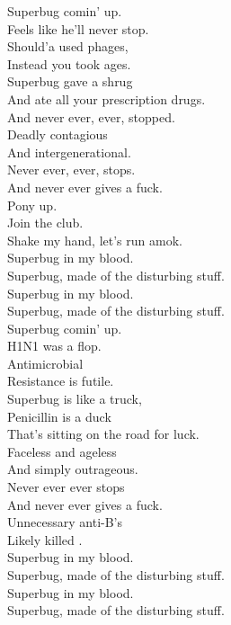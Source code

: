 


Superbug comin' up. \\
Feels like he'll never stop. \\
Should'a used phages, \\
Instead you took ages. \\
Superbug gave a shrug \\
And ate all your prescription drugs. \\
And never ever, ever, stopped. \\
Deadly contagious \\
And intergenerational. \\
Never ever, ever, stops. \\
And never ever gives a fuck. \\

Pony up. \\
Join the club. \\
Shake my hand, let's run amok. \\

Superbug in my blood. \\
Superbug, made of the disturbing stuff. \\
Superbug in my blood. \\
Superbug, made of the disturbing stuff. \\

Superbug comin' up. \\
H1N1 was a flop. \\
Antimicrobial \\
Resistance is futile. \\
Superbug is like a truck, \\
Penicillin is a duck \\
That's sitting on the road for luck. \\
Faceless and ageless \\
And simply outrageous. \\
Never ever ever stops \\
And never ever gives a fuck. \\

Unnecessary anti-B's \\
Likely killed . \\

Superbug in my blood. \\
Superbug, made of the disturbing stuff. \\
Superbug in my blood. \\
Superbug, made of the disturbing stuff. \\

